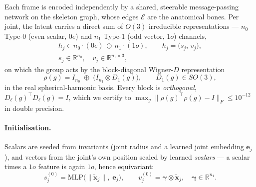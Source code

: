 Each frame is encoded independently by a shared, steerable message-passing network on the skeleton
graph, whose edges $\mathcal{E}$ are the anatomical bones. Per joint, the latent carries a direct sum
of $O(3)$ irreducible representations --- $n_0$ Type-0 (even scalar, $0e$) and $n_1$ Type-1 (odd
vector, $1o$) channels,
%
\begin{equation}
\label{eq:irreps}
\begin{gathered}
h_j \in n_0\!\cdot\!(0e)\,\oplus\, n_1\!\cdot\!(1o),
\qquad h_j=\big(s_j,\,v_j\big),\\[2pt]
s_j\in\mathbb{R}^{n_0},\quad v_j\in\mathbb{R}^{n_1\times3},
\end{gathered}
\end{equation}
%
on which the group acts by the block-diagonal Wigner-$D$ representation
%
\begin{equation}
\label{eq:rho}
\rho(g)=I_{n_0}\;\oplus\;\big(I_{n_1}\otimes D_1(g)\big),\qquad D_1(g)\in SO(3),
\end{equation}
%
in the real spherical-harmonic basis. Every block is \emph{orthogonal},
$D_{\ell}(g)^{\!\top}D_{\ell}(g)=I$, which we certify to
$\max_g\|\rho(g)^{\!\top}\rho(g)-I\|_F\le10^{-12}$ in double precision.

\paragraph{Initialisation.} Scalars are seeded from invariants (joint radius and a learned joint
embedding $\bm{e}_j$), and vectors from the joint's own position scaled by learned \emph{scalars}
--- a scalar times a $1o$ feature is again $1o$, hence equivariant:
%
\begin{equation}
\label{eq:init}
s_j^{(0)}=\mathrm{MLP}\big(\|\tilde{\bm{x}}_j\|,\;\bm{e}_j\big),
\qquad
v_j^{(0)}=\bm{\gamma}\otimes\tilde{\bm{x}}_j,\quad \bm{\gamma}\in\mathbb{R}^{n_1}.
\end{equation}

